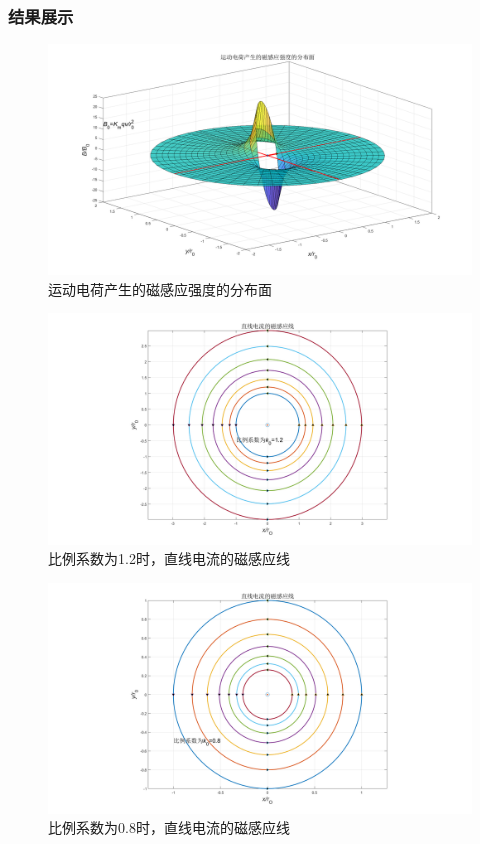 \documentclass[UTF8]{article}
\numberwithin{figure}{subsection}
\numberwithin{table}{subsection}
\begin{document}
\begin{multicols}{2}
	\subsubsection{结果展示}
	\begin{figure}[H]
		\centering
		\includegraphics[scale=0.15]{5_1.2_1.png}
		\caption{运动电荷产生的磁感应强度的分布面}
	\end{figure}
	\begin{figure}[H]
		\centering
		\includegraphics[scale=0.15]{5_1.2_2.png}
		\caption{比例系数为1.2时，直线电流的磁感应线}
	\end{figure}
	\begin{figure}[H]
		\centering
		\includegraphics[scale=0.15]{5_0.8.png}
		\caption{比例系数为0.8时，直线电流的磁感应线}
	\end{figure}

\end{multicols}
\end{document}
